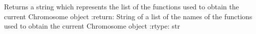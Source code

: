 \documentclass[letterpaper,10pt,english]{sphinxmanual}
\begin{document}
\begin{fulllineitems}
\begin{fulllineitems}
\label{\detokenize{genetic:genetic.Chromosome.strategy_str}}
\sphinxAtStartPar
Returns a string which represents the list of the functions used to obtain the current Chromosome object
:return: String of a list of the names of the functions used to obtain the current Chromosome object
:rtype: str

\end{fulllineitems}


\end{fulllineitems}

\end{document}
